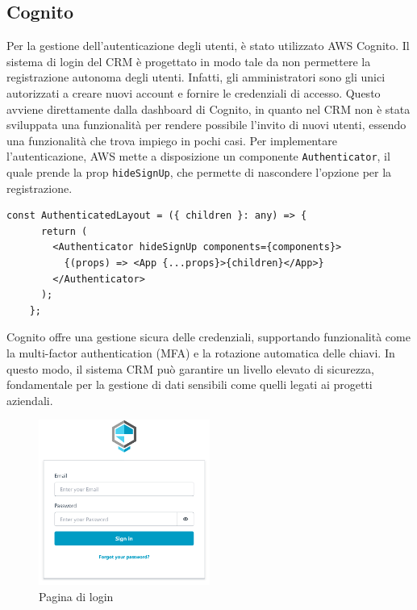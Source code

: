 \documentclass[target=bach,aauheader=,style=]{thud}
\begin{document}
\subsection{Cognito}
Per la gestione dell'autenticazione degli utenti, è stato utilizzato AWS Cognito. Il sistema di login del CRM è progettato in modo tale da non permettere la registrazione autonoma degli utenti. Infatti, gli amministratori sono gli unici autorizzati a creare nuovi account e fornire le credenziali di accesso. Questo avviene direttamente dalla dashboard di Cognito, in quanto nel CRM non è stata sviluppata una funzionalità per rendere possibile l'invito di nuovi utenti, essendo una funzionalità che trova impiego in pochi casi. Per implementare l'autenticazione, AWS mette a disposizione un componente \texttt{Authenticator}, il quale prende la prop \texttt{hideSignUp}, che permette di nascondere l'opzione per la registrazione.


\begin{lstlisting}[caption=Parte del file \texttt{AuthenticatedLayout.tsx} del CRM]
    const AuthenticatedLayout = ({ children }: any) => {
      return (
        <Authenticator hideSignUp components={components}>
          {(props) => <App {...props}>{children}</App>}
        </Authenticator>
      );
    };
\end{lstlisting}

\noindent Cognito offre una gestione sicura delle credenziali, supportando funzionalità come la multi-factor authentication (MFA) e la rotazione automatica delle chiavi. In questo modo, il sistema CRM può garantire un livello elevato di sicurezza, fondamentale per la gestione di dati sensibili come quelli legati ai progetti aziendali.

\begin{figure}[H]
    \centering
    \includegraphics[width=0.5\textwidth]{img/login.pdf} 
    \caption{Pagina di login}
\end{figure}
\end{document}
